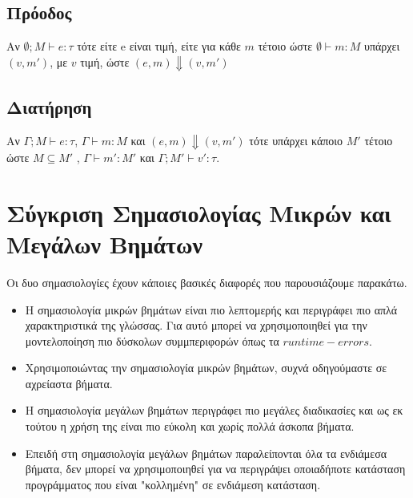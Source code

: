 \documentclass[a4paper]{article}
\begin{document}
\subsection*{Πρόοδος}
Αν \( \emptyset ; M \vdash e: \tau\) τότε είτε e είναι τιμή, είτε για κάθε \(m\) τέτοιο ώστε \( \emptyset \vdash m:M\) υπάρχει \((v, m')\), με \(v\) τιμή, ώστε \((e,m) \Downarrow (v, m')\)

\subsection*{Διατήρηση}
Αν \(\Gamma ; M \vdash e:\tau\), \(\Gamma \vdash m: M\) και \((e,m) \Downarrow (v, m')\) τότε υπάρχει κάποιο \(M'\) τέτοιο ώστε \( M \subseteq M' \) , \(\Gamma \vdash m' : M' \) και \(\Gamma ; M' \vdash v' : \tau\).


\section*{Σύγκριση Σημασιολογίας Μικρών και Μεγάλων Βημάτων}
Οι δυο σημασιολογίες έχουν κάποιες βασικές διαφορές που παρουσιάζουμε παρακάτω.
\begin{itemize}
\item Η σημασιολογία μικρών βημάτων είναι πιο λεπτομερής και περιγράφει πιο απλά χαρακτηριστικά της γλώσσας. Για αυτό μπορεί να χρησιμοποιηθεί για την μοντελοποίηση πιο δύσκολων συμμπεριφορών όπως τα \(runtime-errors\).
\item Χρησιμοποιώντας την σημασιολογία μικρών βημάτων, συχνά οδηγούμαστε σε αχρείαστα βήματα.
\item Η σημασιολογία μεγάλων βημάτων περιγράφει πιο μεγάλες διαδικασίες και ως εκ τούτου η χρήση της είναι πιο εύκολη και χωρίς πολλά άσκοπα βήματα.
\item Επειδή στη σημασιολογία μεγάλων βημάτων παραλείπονται όλα τα ενδιάμεσα βήματα, δεν μπορεί να χρησιμοποιηθεί για να περιγράψει οποιαδήποτε κατάσταση προγράμματος που είναι "κολλημένη" σε ενδιάμεση κατάσταση.  
\end{itemize}
\end{document}
